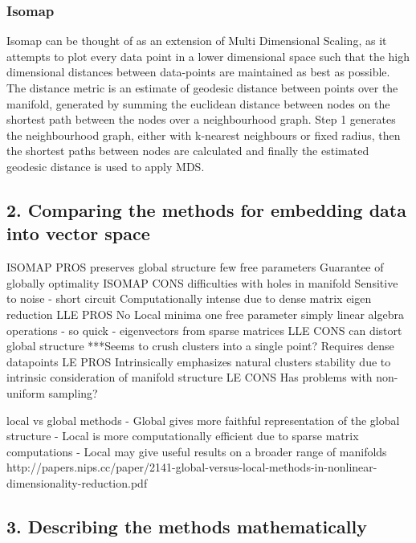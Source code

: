\documentclass{article}
\begin{document}
\subsubsection{Isomap}
Isomap can be thought of as an extension of Multi Dimensional Scaling, as it attempts to plot every data point in a lower dimensional space such that the high dimensional distances between data-points are maintained as best as possible. The distance metric is an estimate of geodesic distance between points over the manifold, generated by summing the euclidean distance between nodes on the shortest path between the nodes over a neighbourhood graph. Step 1 generates the neighbourhood graph, either with k-nearest neighbours or fixed radius, then the shortest paths between nodes are calculated and finally the estimated geodesic distance is used to apply MDS.
\subsection{2. Comparing the methods for embedding data into vector space}
ISOMAP PROS
preserves global structure
few free parameters
Guarantee of globally optimality
ISOMAP CONS
difficulties with holes in manifold
Sensitive to noise - short circuit 
Computationally intense due to dense matrix eigen reduction 
LLE PROS
No Local minima
one free parameter
simply linear algebra operations - so quick - eigenvectors from sparse matrices 
LLE CONS
can distort global structure 
***Seems to crush clusters into a single point?
Requires dense datapoints
LE PROS
Intrinsically emphasizes natural clusters 
stability due to intrinsic consideration of manifold structure
LE CONS
Has problems with non-uniform sampling?

local vs global methods
- Global gives more faithful representation of the global structure
- Local is more computationally efficient due to sparse matrix computations 
- Local may give useful results on a broader range of manifolds
http://papers.nips.cc/paper/2141-global-versus-local-methods-in-nonlinear-dimensionality-reduction.pdf
\subsection{3. Describing the methods mathematically}
\end{document}
